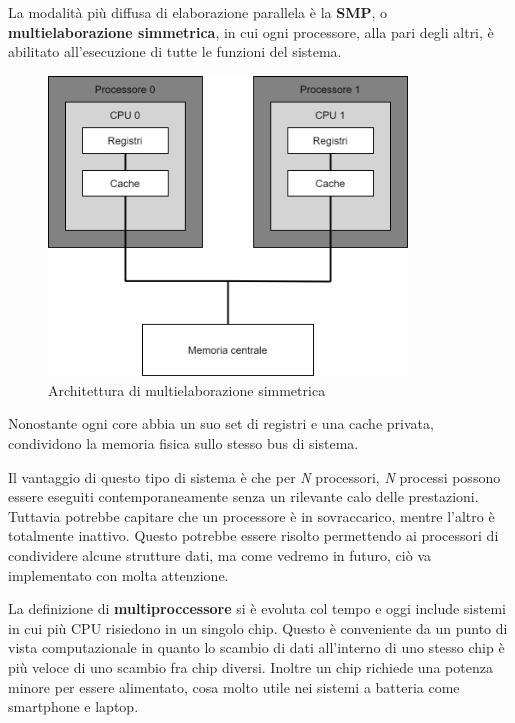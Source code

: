             La modalità più diffusa di elaborazione parallela è la \textbf{SMP}, o \textbf{multielaborazione simmetrica}, in cui ogni processore, alla pari degli altri, è abilitato all'esecuzione di tutte le funzioni del sistema.
            
            \begin{figure}[h]
                \centering
                \includegraphics[width=0.85\textwidth]{img/img3.png}
                \caption{Architettura di multielaborazione simmetrica}
                \label{fig:img3}
            \end{figure}
            
            \newpage
            Nonostante ogni core abbia un suo set di registri e una cache privata, condividono la memoria fisica sullo stesso bus di sistema.
            
            Il vantaggio di questo tipo di sistema è che per \textit{N} processori, \textit{N} processi possono essere eseguiti contemporaneamente senza un rilevante calo delle prestazioni. Tuttavia potrebbe capitare che un processore è in sovraccarico, mentre l'altro è totalmente inattivo. Questo potrebbe essere risolto permettendo ai processori di condividere alcune strutture dati, ma come vedremo in futuro, ciò va implementato con molta attenzione.
            
            La definizione di \textbf{multiproccessore} si è evoluta col tempo e oggi include sistemi in cui più CPU risiedono in un singolo chip. Questo è conveniente da un punto di vista computazionale in quanto lo scambio di dati all'interno di uno stesso chip è più veloce di uno scambio fra chip diversi. Inoltre un chip richiede una potenza minore per essere alimentato, cosa molto utile nei sistemi a batteria come smartphone e laptop.
            
